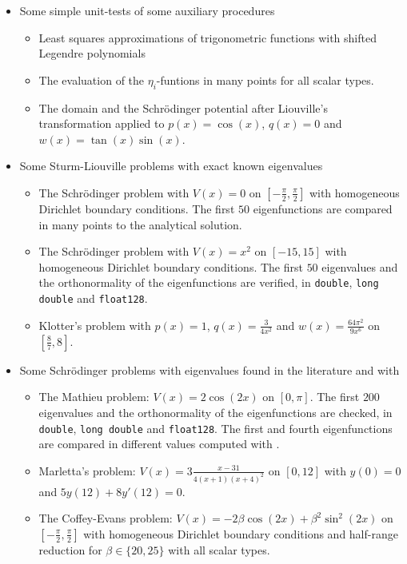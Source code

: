 \begin{itemize}
    \item Some simple unit-tests of some auxiliary procedures \begin{itemize}
              \item Least squares approximations of trigonometric functions with shifted Legendre polynomials
              \item The evaluation of the $\eta_i$-funtions in many points for all scalar types.
              \item The domain and the Schrödinger potential after Liouville's transformation applied to $p(x) = \cos(x)$, $q(x) = 0$ and $w(x) = \tan(x) \sin(x)$.
          \end{itemize}
    \item Some Sturm-Liouville problems with exact known eigenvalues \begin{itemize}
              \item The Schrödinger problem with $V(x) = 0$ on $\left[-\frac{\pi}{2}, \frac{\pi}{2}\right]$ with homogeneous Dirichlet boundary conditions. The first $50$ eigenfunctions are compared in many points to the analytical solution.
              \item The Schrödinger problem with $V(x) = x^2$ on $\left[-15, 15\right]$ with homogeneous Dirichlet boundary conditions. The first $50$ eigenvalues and the orthonormality of the eigenfunctions are verified, in \texttt{double}, \texttt{long double} and \texttt{float128}.
              \item Klotter's problem with $p(x) = 1$, $q(x) = \frac{3}{4x^2}$ and $w(x) = \frac{64\pi^2}{9 x^6}$ on $\left[\frac{8}{7}, 8\right]$.
          \end{itemize}
    \item Some Schrödinger problems with eigenvalues found in the literature and with \begin{itemize}
              \item The Mathieu problem: $V(x)= 2\cos(2x)$ on $[0, \pi]$. The first $200$ eigenvalues and the orthonormality of the eigenfunctions are checked, in \texttt{double}, \texttt{long double} and \texttt{float128}. The first and fourth eigenfunctions are compared in different values computed with .
              \item Marletta's problem: $V(x) = 3\frac{x-31}{4(x+1)(x+4)^2}$ on $[0,12]$ with $y(0) = 0$ and $5 y(12) + 8 y'(12) = 0$.
              \item The Coffey-Evans problem: $V(x) = -2 \beta \cos(2x) + \beta^2 \sin^2(2x)$ on $\left[-\frac{\pi}{2}, \frac{\pi}{2}\right]$ with homogeneous Dirichlet boundary conditions and half-range reduction for $\beta \in \{20, 25\}$ with all scalar types.

\end{itemize}
\end{itemize}
